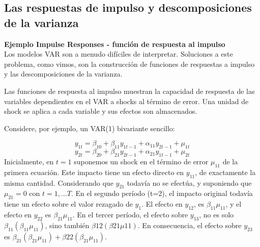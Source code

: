 \subsection{Las respuestas de impulso y descomposiciones de la varianza}
	
	\textbf{Ejemplo Impulse Responses - funci\'on de respuesta al impulso}\\
	Los modelos VAR son a menudo dif\'{i}ciles de interpretar. Soluciones a este problema, como vimos, son la construcci\'on de funciones de respuestas a impulso y las descomposiciones de la varianza.
	
	Las funciones de respuesta al impulso muestran la capacidad de respuesta de las variables dependientes en el VAR a shocks al t\'ermino de error. Una unidad de shock se aplica a cada variable y sus efectos son almacenados.
	
	
	
	Considere, por ejemplo, un VAR(1) bivariante sencillo:
	
	\begin{equation*}
	y_{1t} = \beta_{10} + \beta_{11} y_{1t-1} + \alpha_{11} y_{2t-1} + \mu_{1t}
	\end{equation*}
	\begin{equation*}
	y_{2t} = \beta_{20} + \beta_{21} y_{2t-1} + \alpha_{21} y_{1t-1} + \mu_{2t}
	\end{equation*}
Inicialmente, en $t=1$ suponemos un shock en el término de error $\mu_{11}$ de la primera ecuación. Este impacto tiene un efecto directo en $y_{11}$, de exactamente la misma cantidad.
Considerando que $y_{21}$ todavía no se efectúa, y suponiendo que $\mu_{21}=0$ con $t=1, \dots T$. En el segundo período (t=2), el impacto original todavía tiene un efecto sobre el valor rezagado de $y_{1}$. El efecto en $y_{12}$, es $\beta_{11}\mu_{11}$, y el efecto en $y_{22}$ es $\beta_{21}\mu_{11}$. En el tercer período, el efecto sobre $y_{13}$, no es solo $\beta_{11}(\beta_{11}\mu_{11})$, sino también $\beta{12}(\beta{21}\mu{11})$. En consecuencia, el efecto sobre $y_{23}$ es $\beta_{21}(\beta_{21}\mu_{11})+\beta{22}(\beta_{21}\mu_{11})$.

	
